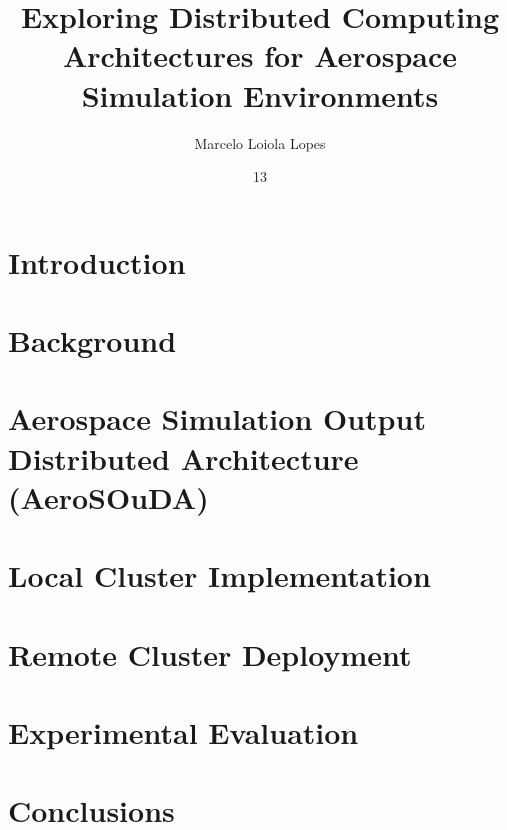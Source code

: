 \documentclass[tg, eng]{ita}    %
\author{Marcelo Loiola Lopes}{Veras}
\title{Exploring Distributed Computing Architectures for Aerospace Simulation Environments}
\date{13}{november}{2026}
\begin{document}


\mainmatter

\chapter{Introduction}


\chapter{Background}


\chapter{Aerospace Simulation Output Distributed Architecture (AeroSOuDA)}


\chapter{Local Cluster Implementation}


\chapter{Remote Cluster Deployment}


\chapter{Experimental Evaluation}


\chapter{Conclusions}



\renewcommand\bibname{\itareferencesnamebabel} %
\printbibliography

% 

\end{document}

